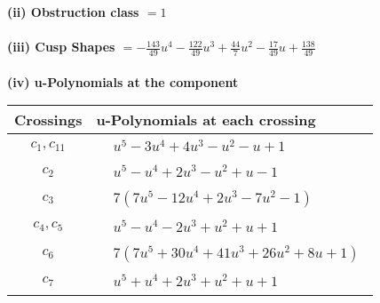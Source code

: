 \documentclass[1p]{elsarticle_modified}
\theoremstyle{definition}
\begin{document}
\flushleft \textbf{(ii) Obstruction class $= 1$}\\~\\
\flushleft \textbf{(iii) Cusp Shapes $= -\frac{143}{49} u^4-\frac{122}{49} u^3+\frac{44}{7} u^2-\frac{17}{49} u+\frac{138}{49}$}\\~\\
\newpage\renewcommand{\arraystretch}{1}
\flushleft \textbf{(iv) u-Polynomials at the component}\newline \\
\begin{tabular}{m{50pt}|m{274pt}}
Crossings & \hspace{64pt}u-Polynomials at each crossing \\
\hline $$\begin{aligned}c_{1},c_{11}\end{aligned}$$&$\begin{aligned}
&u^5-3 u^4+4 u^3- u^2- u+1
\end{aligned}$\\
\hline $$\begin{aligned}c_{2}\end{aligned}$$&$\begin{aligned}
&u^5- u^4+2 u^3- u^2+u-1
\end{aligned}$\\
\hline $$\begin{aligned}c_{3}\end{aligned}$$&$\begin{aligned}
&7(7 u^5-12 u^4+2 u^3-7 u^2-1)
\end{aligned}$\\
\hline $$\begin{aligned}c_{4},c_{5}\end{aligned}$$&$\begin{aligned}
&u^5- u^4-2 u^3+u^2+u+1
\end{aligned}$\\
\hline $$\begin{aligned}c_{6}\end{aligned}$$&$\begin{aligned}
&7(7 u^5+30 u^4+41 u^3+26 u^2+8 u+1)
\end{aligned}$\\
\hline $$\begin{aligned}c_{7}\end{aligned}$$&$\begin{aligned}
&u^5+u^4+2 u^3+u^2+u+1
\end{aligned}$\\

\end{tabular}
\end{document}
